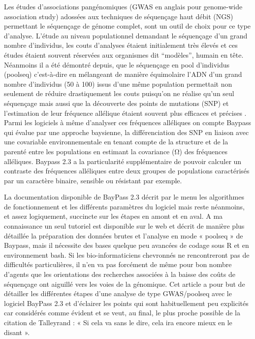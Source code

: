 \documentclass[
  openany]{book}
\begin{document}
Les études d'associations pangénomiques (GWAS en anglais pour genome-wide association study) adossées aux techniques de séquençage haut débit (NGS) permettant le séquençage de génome complet, sont un outil de choix pour ce type d'analyse. L'étude au niveau populationnel demandant le séquençage d'un grand nombre d'individus, les couts d'analyses étaient initialement très élevés et ces études étaient souvent réservées aux organismes dit ``modèles'', humain en tête. Néanmoins il a été démontré depuis, que le séquençage en pool d'individus (poolseq) c'est-à-dire en mélangeant de manière équimolaire l'ADN d'un grand nombre d'individus (50 à 100) issus d'une même population permettait non seulement de réduire drastiquement les couts puisqu'on ne réalise qu'un seul séquençage mais aussi que la découverte des points de mutations (SNP) et l'estimation de leur fréquence allélique étaient souvent plus efficaces et précises \citep{futschik_next_2010}. Parmi les logiciels à même d'analyser ces fréquences alléliques on compte Baypass \citep{gautier_genome-wide_2015} qui évalue par une approche baysienne, la différenciation des SNP en liaison avec une covariable environnementale en tenant compte de la structure et de la parenté entre les populations en estimant la covariance (Ω) des fréquences alléliques. Baypass 2.3 a la particularité supplémentaire de pouvoir calculer un contraste des fréquences alléliques entre deux groupes de populations caractérisés par un caractère binaire, sensible ou résistant par exemple.

La documentation disponible de BayPass 2.3 décrit par le menu les algorithmes de fonctionnement et les différents paramètres du logiciel mais reste néanmoins, et assez logiquement, succincte sur les étapes en amont et en aval. A ma connaissance un seul tutoriel est disponible sur le web \citep{nielsen_pool-seq_2020} et décrit de manière plus détaillée la préparation des données brutes et l'analyse en mode « poolseq » de Baypass, mais il nécessite des bases quelque peu avancées de codage sous R et en environnement bash. Si les bio-informaticiens chevronnés ne rencontreront pas de difficultés particulières, il n'en va pas forcément de même pour bon nombre d'agents que les orientations des recherches associées à la baisse des coûts de séquençage ont aiguillé vers les voies de la génomique. Cet article a pour but de détailler les différentes étapes d'une analyse de type GWAS/poolseq avec le logiciel BayPass 2.3 et d'éclairer les points qui sont habituellement peu explicités car considérés comme évident et se veut, au final, le plus proche possible de la citation de Talleyrand : « Si cela va sans le dire, cela ira encore mieux en le disant ».
\end{document}
